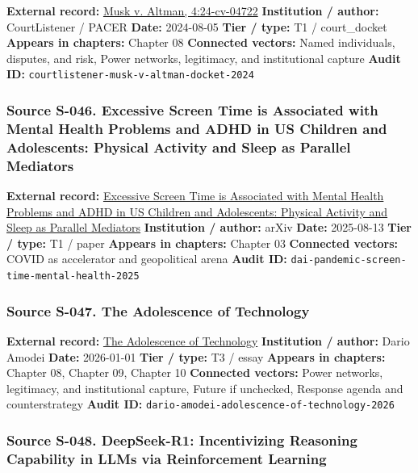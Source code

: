 \documentclass[
  american,
  11pt,
  letterpaper,
]{article}
\begin{document}
\textbf{External record:}
\href{https://www.courtlistener.com/docket/69013420/musk-v-altman/}{Musk
v. Altman, 4:24-cv-04722} \textbf{Institution / author:} CourtListener /
PACER \textbf{Date:} 2024-08-05 \textbf{Tier / type:} T1 / court\_docket
\textbf{Appears in chapters:} Chapter 08 \textbf{Connected vectors:}
Named individuals, disputes, and risk, Power networks, legitimacy, and
institutional capture \textbf{Audit ID:}
\texttt{courtlistener-musk-v-altman-docket-2024}

\subsubsection{Source S-046. Excessive Screen Time is Associated with
Mental Health Problems and ADHD in US Children and Adolescents: Physical
Activity and Sleep as Parallel
Mediators}\label{source-s-046-excessive-screen-time-is-associated-with-mental-health-problems-and-adhd-in-us-children-and-adolescents-physical-activity-and-sleep-as-parallel-mediators}

\textbf{External record:}
\href{https://arxiv.org/abs/2508.10062}{Excessive Screen Time is
Associated with Mental Health Problems and ADHD in US Children and
Adolescents: Physical Activity and Sleep as Parallel Mediators}
\textbf{Institution / author:} arXiv \textbf{Date:} 2025-08-13
\textbf{Tier / type:} T1 / paper \textbf{Appears in chapters:} Chapter
03 \textbf{Connected vectors:} COVID as accelerator and geopolitical
arena \textbf{Audit ID:}
\texttt{dai-pandemic-screen-time-mental-health-2025}

\subsubsection{Source S-047. The Adolescence of
Technology}\label{source-s-047-the-adolescence-of-technology}

\textbf{External record:}
\href{https://darioamodei.com/essay/the-adolescence-of-technology}{The
Adolescence of Technology} \textbf{Institution / author:} Dario Amodei
\textbf{Date:} 2026-01-01 \textbf{Tier / type:} T3 / essay
\textbf{Appears in chapters:} Chapter 08, Chapter 09, Chapter 10
\textbf{Connected vectors:} Power networks, legitimacy, and
institutional capture, Future if unchecked, Response agenda and
counterstrategy \textbf{Audit ID:}
\texttt{dario-amodei-adolescence-of-technology-2026}

\subsubsection{Source S-048. DeepSeek-R1: Incentivizing Reasoning
Capability in LLMs via Reinforcement
Learning}\label{source-s-048-deepseek-r1-incentivizing-reasoning-capability-in-llms-via-reinforcement-learning}
\end{document}
